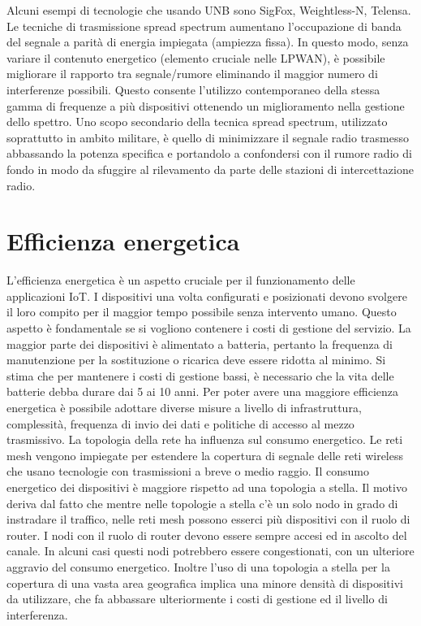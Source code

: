 \documentclass[12pt,a4paper,openright,twoside]{report}
\begin{document}
Alcuni esempi di tecnologie che usando UNB sono SigFox, Weightless-N, Telensa.
Le tecniche di trasmissione spread spectrum aumentano l'occupazione di banda del segnale a parit\`a di energia impiegata (ampiezza fissa).  In questo modo, senza variare il contenuto energetico (elemento cruciale nelle LPWAN), \`e possibile migliorare il rapporto tra segnale/rumore eliminando il maggior numero di interferenze possibili. 
Questo consente l'utilizzo contemporaneo della stessa gamma di frequenze a pi\`u dispositivi ottenendo un miglioramento nella gestione dello spettro. 
Uno scopo secondario della tecnica spread spectrum, utilizzato soprattutto in ambito militare, \`e quello di minimizzare il segnale radio trasmesso abbassando la potenza specifica e portandolo a confondersi con il rumore radio di fondo in modo da sfuggire al rilevamento da parte delle stazioni di intercettazione radio. \cite{K2}

\section{Efficienza energetica}
L'efficienza energetica \`e un aspetto cruciale per il funzionamento delle applicazioni IoT.
I dispositivi una volta configurati e posizionati devono svolgere il loro compito per il maggior tempo possibile senza intervento umano. 
Questo aspetto \`e fondamentale se si vogliono contenere i costi di gestione del servizio. 
La maggior parte dei dispositivi \`e alimentato a batteria, pertanto la frequenza di manutenzione per la sostituzione o ricarica deve essere ridotta al minimo.
Si stima che per mantenere i costi di gestione bassi, \`e necessario che la vita delle batterie debba durare dai 5 ai 10 anni. 
Per poter avere una maggiore efficienza energetica \`e possibile adottare diverse misure a livello di infrastruttura, complessit\`a, frequenza di invio dei dati e politiche di accesso al mezzo trasmissivo.
La topologia della rete ha influenza sul consumo energetico.
Le reti mesh vengono impiegate  per estendere la copertura di segnale delle reti wireless che usano tecnologie con trasmissioni a breve o medio raggio. Il consumo energetico dei dispositivi \`e maggiore rispetto ad una topologia a stella. 
Il motivo deriva dal fatto che mentre nelle topologie a stella c'\`e un solo nodo in grado di instradare il traffico, nelle reti mesh possono esserci pi\`u dispositivi con il ruolo di router.
I nodi con il ruolo di router devono essere sempre accesi ed in ascolto del canale. 
In alcuni casi questi nodi potrebbero essere congestionati, con un ulteriore aggravio del consumo energetico.  
Inoltre l'uso di una topologia a stella per la copertura di una vasta area geografica implica una minore densit\`a di dispositivi da utilizzare, che fa abbassare ulteriormente i costi di gestione ed il livello di interferenza. 
\end{document}
